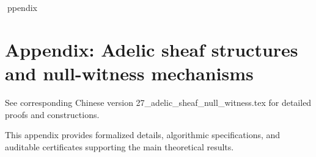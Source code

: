 ppendix

\section*{Appendix: Adelic sheaf structures and null-witness mechanisms}

See corresponding Chinese version 27_adelic_sheaf_null_witness.tex for detailed proofs and constructions.

This appendix provides formalized details, algorithmic specifications, and auditable certificates supporting the main theoretical results.
